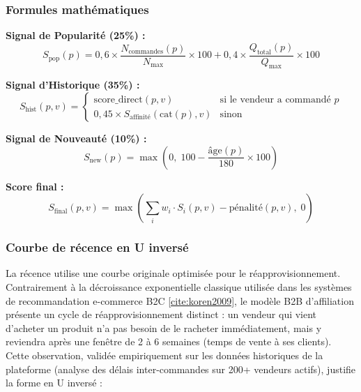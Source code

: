\documentclass[12pt,a4paper,openany]{report}
\begin{document}
\subsubsection{Formules mathématiques}

\textbf{Signal de Popularité (25\%) :}
\begin{equation}
  S_{\text{pop}}(p) = 0{,}6 \times \frac{N_{\text{commandes}}(p)}{N_{\max}} \times 100 + 0{,}4 \times \frac{Q_{\text{total}}(p)}{Q_{\max}} \times 100
\end{equation}

\textbf{Signal d'Historique (35\%) :}
\begin{equation}
  S_{\text{hist}}(p, v) =
  \begin{cases}
    \text{score\_direct}(p, v) & \text{si le vendeur a commandé } p \\
    0{,}45 \times S_{\text{affinité}}(\text{cat}(p), v) & \text{sinon}
  \end{cases}
\end{equation}

\textbf{Signal de Nouveauté (10\%) :}
\begin{equation}
  S_{\text{new}}(p) = \max\left(0,\; 100 - \frac{\text{âge}(p)}{180} \times 100\right)
\end{equation}

\textbf{Score final :}
\begin{equation}
  S_{\text{final}}(p, v) = \max\left(\sum_{i} w_i \cdot S_i(p, v) - \text{pénalité}(p, v),\; 0\right)
\end{equation}

\subsubsection{Courbe de récence en U inversé}

La récence utilise une courbe originale optimisée pour le réapprovisionnement. Contrairement à la décroissance exponentielle classique utilisée dans les systèmes de recommandation e-commerce B2C \ref{cite:koren2009}, le modèle B2B d'affiliation présente un cycle de réapprovisionnement distinct : un vendeur qui vient d'acheter un produit n'a pas besoin de le racheter immédiatement, mais y reviendra après une fenêtre de 2 à 6 semaines (temps de vente à ses clients). Cette observation, validée empiriquement sur les données historiques de la plateforme (analyse des délais inter-commandes sur 200+ vendeurs actifs), justifie la forme en U inversé :
\end{document}
